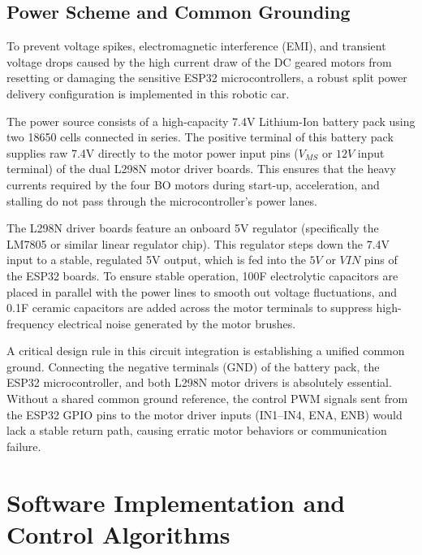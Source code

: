 \documentclass[12pt,a4paper,oneside]{report}
\begin{document}
\section{Power Scheme and Common Grounding}
To prevent voltage spikes, electromagnetic interference (EMI), and transient voltage drops caused by the high current draw of the DC geared motors from resetting or damaging the sensitive ESP32 microcontrollers, a robust split power delivery configuration is implemented in this robotic car.\par
\medskip
The power source consists of a high-capacity 7.4V Lithium-Ion battery pack using two 18650 cells connected in series. The positive terminal of this battery pack supplies raw 7.4V directly to the motor power input pins ($V_{MS}$ or $12V$ input terminal) of the dual L298N motor driver boards. This ensures that the heavy currents required by the four BO motors during start-up, acceleration, and stalling do not pass through the microcontroller's power lanes.\par
\medskip
The L298N driver boards feature an onboard 5V regulator (specifically the LM7805 or similar linear regulator chip). This regulator steps down the 7.4V input to a stable, regulated 5V output, which is fed into the $5V$ or $VIN$ pins of the ESP32 boards. To ensure stable operation, 100\textmu{}F electrolytic capacitors are placed in parallel with the power lines to smooth out voltage fluctuations, and 0.1\textmu{}F ceramic capacitors are added across the motor terminals to suppress high-frequency electrical noise generated by the motor brushes.\par
\medskip
A critical design rule in this circuit integration is establishing a unified common ground. Connecting the negative terminals (GND) of the battery pack, the ESP32 microcontroller, and both L298N motor drivers is absolutely essential. Without a shared common ground reference, the control PWM signals sent from the ESP32 GPIO pins to the motor driver inputs (IN1--IN4, ENA, ENB) would lack a stable return path, causing erratic motor behaviors or communication failure.\par

\chapter{Software Implementation and Control Algorithms}
\end{document}
